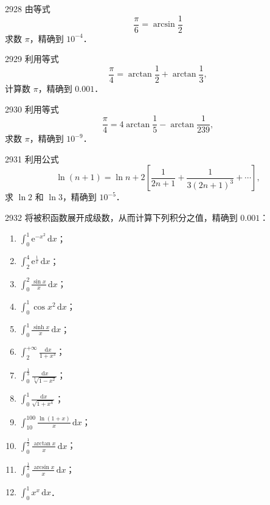 \begin{prob}[M]{2928}
由等式
\[
\frac{\pi}{6} = \arcsin \frac{1}{2}
\]
求数 $\pi$，精确到 $10^{-4}$．
\end{prob}

\begin{prob}[M]{2929}
利用等式
\[
\frac{\pi}{4} = \arctan \frac{1}{2} + \arctan \frac{1}{3},
\]
计算数 $\pi$，精确到 $0.001$．
\end{prob}

\begin{prob}[M]{2930}
利用等式
\[
\frac{\pi}{4} = 4\arctan \frac{1}{5} - \arctan \frac{1}{239},
\]
求数 $\pi$，精确到 $10^{-9}$．
\end{prob}

\begin{prob}[M]{2931}
利用公式
\[
\ln(n + 1) = \ln n + 2\left[\frac{1}{2n + 1} + \frac{1}{3(2n + 1)^3} + \cdots\right],
\]
求 $\ln 2$ 和 $\ln 3$，精确到 $10^{-5}$．
\end{prob}

\begin{prob}[L]{2932}
将被积函数展开成级数，从而计算下列积分之值，精确到 $0.001$：
\begin{enumerate}[label=(\alph*), itemsep=2pt, topsep=3pt]
  \item $\displaystyle \int_0^1 \mathrm{e}^{-x^2} \,\mathrm{d}x$；
  \item $\displaystyle \int_2^4 \mathrm{e}^{\frac{1}{x}} \,\mathrm{d}x$；
  \item $\displaystyle \int_0^2 \frac{\sin x}{x} \,\mathrm{d}x$；
  \item $\displaystyle \int_0^1 \cos x^2 \,\mathrm{d}x$；
  \item $\displaystyle \int_0^1 \frac{\sinh x}{x} \,\mathrm{d}x$；
  \item $\displaystyle \int_2^{+\infty} \frac{\,\mathrm{d}x}{1 + x^3}$；
  \item $\displaystyle \int_0^{\frac{1}{3}} \frac{\,\mathrm{d}x}{\sqrt[3]{1 - x^2}}$；
  \item $\displaystyle \int_0^1 \frac{\,\mathrm{d}x}{\sqrt{1 + x^4}}$；
  \item $\displaystyle \int_{10}^{100} \frac{\ln(1 + x)}{x} \,\mathrm{d}x$；
  \item $\displaystyle \int_0^{\frac{1}{2}} \frac{\arctan x}{x} \,\mathrm{d}x$；
  \item $\displaystyle \int_0^{\frac{1}{2}} \frac{\arcsin x}{x} \,\mathrm{d}x$；
  \item $\displaystyle \int_0^1 x^x \,\mathrm{d}x$．
\end{enumerate}
\end{prob}


